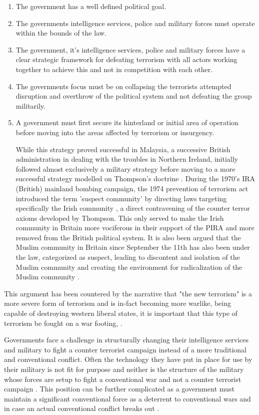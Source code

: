 \begin{enumerate}
\item The government has a well defined political goal.
\item The governments intelligence services, police and military forces must operate within the bounds of the law.
\item The government, it's intelligence services, police and military forces have a clear strategic framework for defeating terrorism with all actors working together to achieve this and not in competition with each other.
\item The governments focus must be on collapsing the terrorists attempted disruption and overthrow of the political system and not defeating the group militarily.
\item A government must first secure its hinterland or initial area of operation before moving into the areas affected by terrorism or insurgency.

While this strategy proved successful in Malaysia, a successive British administration in dealing with the troubles in Northern Ireland, initially followed almost exclusively a military strategy before moving to a more successful strategy modelled on Thompson's doctrine \citep{lafree2009impact}. During the 1970's IRA (British) mainland bombing campaign, the 1974 prevention of terrorism act introduced the term 'suspect community' by directing  laws targeting specifically the Irish community \citep{hillyard1993suspect}, a direct contravening of the counter terror axioms developed by Thompson. This only served to make the Irish community in Britain more vociferous in their support of the PIRA and more removed from the British political system. It is also been argued that the Muslim community in Britain since September the 11th has also been under the law, categorized as suspect, leading to discontent and isolation of the Muslim community and creating the environment for radicalization of the Muslim community \citep{pantazis2009old}.
\end{enumerate}
This argument has been countered by the narrative that "the new terrorism" is a more severe form of terrorism and is in-fact becoming more warlike, being capable of destroying western liberal states, it is important that this type of terrorism be fought on a war footing, \citep{bobbitt2008terror}.

Governments face a challenge in structurally changing their intelligence services and military to fight a counter terrorist campaign instead of a more traditional and conventional conflict. Often the technology they have put in place for use by their military is not fit for purpose and neither is the structure of the military whose forces are setup to fight a conventional war and not a counter terrorist campaign \citep{gazette1989changing}. This position can be further complicated as a government must maintain a significant conventional force as a deterrent to conventional wars and in case an actual conventional conflict breaks out \citep{gates2009balanced}.

